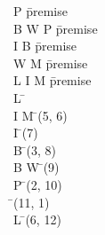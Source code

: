 \documentclass{article}
\begin{document}
\begin{proofbox}
\: \lnot P \= \hbox{premise} \\
\: B \lor W \rightarrow P \= \hbox{premise} \\
\: \lnot I \rightarrow B \= \hbox{premise} \\
\: \lnot W \rightarrow M \= \hbox{premise} \\
\: L \rightarrow \lnot I \land \lnot M \= \hbox{premise} \\
\open
\: L \= \asm \\
\: \lnot I \land \lnot M \= \implieselim(5, 6) \\
\: \lnot I \= \andelim(7) \\
\: B \= \implieselim(3, 8) \\
\: B \lor W \= \orintro(9) \\
\: P \= \implieselim(2, 10) \\
\: \bot \= \bottomintro(11, 1) \\
\close
\: \lnot L \= \notintro(6, 12) \\
\end{proofbox}
\end{document}
